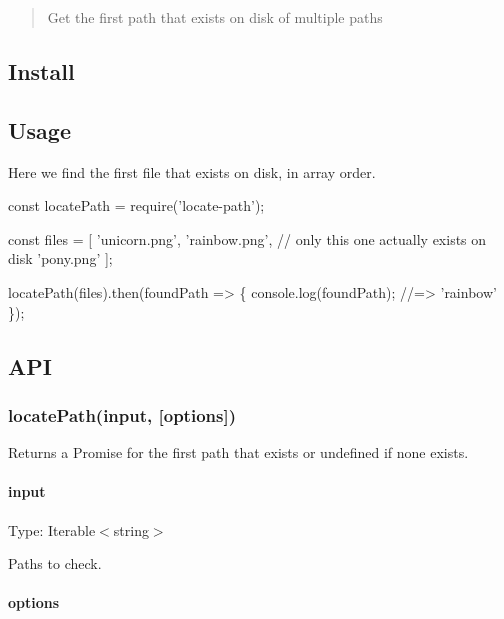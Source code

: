 \begin{quote}
Get the first path that exists on disk of multiple paths \end{quote}


\subsection*{Install}




\subsection*{Usage}

Here we find the first file that exists on disk, in array order.


\begin{DoxyCode}
const locatePath = require('locate-path');

const files = [
    'unicorn.png',
    'rainbow.png', // only this one actually exists on disk
    'pony.png'
];

locatePath(files).then(foundPath => \{
    console.log(foundPath);
    //=> 'rainbow'
\});
\end{DoxyCode}


\subsection*{A\+PI}

\subsubsection*{locate\+Path(input, \mbox{[}options\mbox{]})}

Returns a {\ttfamily Promise} for the first path that exists or {\ttfamily undefined} if none exists.

\paragraph*{input}

Type\+: {\ttfamily Iterable$<$string$>$}

Paths to check.

\paragraph*{options}


